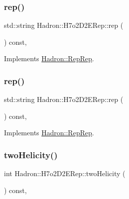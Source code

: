\subsubsection{\texorpdfstring{rep()}{rep()}\hspace{0.1cm}{\footnotesize\ttfamily [4/5]}}
{\footnotesize\ttfamily std\+::string Hadron\+::\+H7o2\+D2\+E\+Rep\+::rep (\begin{DoxyParamCaption}{ }\end{DoxyParamCaption}) const\hspace{0.3cm}{\ttfamily [inline]}, {\ttfamily [virtual]}}



Implements \mbox{\hyperlink{structHadron_1_1RepRep_ab3213025f6de249f7095892109575fde}{Hadron\+::\+Rep\+Rep}}.

\mbox{\label{structHadron_1_1H7o2D2ERep_abd5db7339f3bf5e389260db649418d0d}} 
\subsubsection{\texorpdfstring{rep()}{rep()}\hspace{0.1cm}{\footnotesize\ttfamily [5/5]}}
{\footnotesize\ttfamily std\+::string Hadron\+::\+H7o2\+D2\+E\+Rep\+::rep (\begin{DoxyParamCaption}{ }\end{DoxyParamCaption}) const\hspace{0.3cm}{\ttfamily [inline]}, {\ttfamily [virtual]}}



Implements \mbox{\hyperlink{structHadron_1_1RepRep_ab3213025f6de249f7095892109575fde}{Hadron\+::\+Rep\+Rep}}.

\mbox{\label{structHadron_1_1H7o2D2ERep_ab74ff7de742966a259984e56abc8dc12}} 
\subsubsection{\texorpdfstring{twoHelicity()}{twoHelicity()}\hspace{0.1cm}{\footnotesize\ttfamily [1/3]}}
{\footnotesize\ttfamily int Hadron\+::\+H7o2\+D2\+E\+Rep\+::two\+Helicity (\begin{DoxyParamCaption}{ }\end{DoxyParamCaption}) const\hspace{0.3cm}{\ttfamily [inline]}, {\ttfamily [virtual]}}

